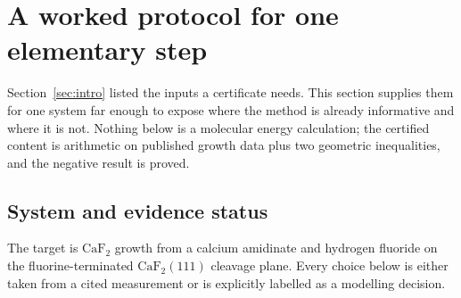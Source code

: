 \section{A worked protocol for one elementary step}
\label{sec:worked}

Section~\ref{sec:intro} listed the inputs a certificate needs. This section
supplies them for one system far enough to expose where the method is already
informative and where it is not. Nothing below is a molecular energy
calculation; the certified content is arithmetic on published growth data plus
two geometric inequalities, and the negative result is proved.

\subsection{System and evidence status}

The target is $\mathrm{CaF_2}$ growth from a calcium amidinate and hydrogen
fluoride on the fluorine-terminated $\mathrm{CaF_2}(111)$ cleavage plane.
Every choice below is either taken from a cited measurement or is explicitly
labelled as a modelling decision.

